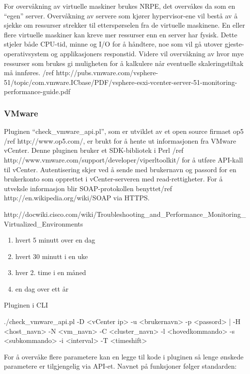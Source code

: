 For overvåkning av virtuelle maskiner brukes NRPE, det overvåkes da som en “egen” server. Overvåkning av servere som kjører hypervisor-ene vil bestå av å sjekke om ressurser strekker til etterspørselen fra de virtuelle maskinene. En eller flere virtuelle maskiner kan kreve mer ressurser enn en server har fysisk. Dette stjeler både CPU-tid, minne og I/O for å håndtere, noe som vil gå utover gjeste-operativsystem og applikasjoners responstid. Videre vil overvåkning av hvor mye ressurser som brukes gi muligheten for å kalkulere når eventuelle skaleringstiltak må innføres. /ref http://pubs.vmware.com/vsphere-51/topic/com.vmware.ICbase/PDF/vsphere-esxi-vcenter-server-51-monitoring-performance-guide.pdf

\subsubsection{VMware}

Pluginen “check\_vmware\_api.pl”, som er utviklet av et open source firmaet op5 /ref http://www.op5.com/, er brukt for å hente ut informasjonen fra VMware vCenter. Denne pluginen bruker et SDK-bibliotek i Perl /ref http://www.vmware.com/support/developer/viperltoolkit/ for å utføre API-kall til vCenter. Autentisering skjer ved å sende med brukernavn og passord for en brukerkonto som opprettet i vCenter-serveren med read-rettigheter. For å utveksle informasjon blir SOAP-protokollen benyttet/ref http://en.wikipedia.org/wiki/SOAP via HTTPS. 

http://docwiki.cisco.com/wiki/Troubleshooting\_and\_Performance\_Monitoring\_Virtualized\_Environments

\begin{enumerate}
	\item hvert 5 minutt over en dag 
	\item hvert 30 minutt i en uke
	\item hver 2. time i en måned
	\item en dag over ett år
\end{enumerate}

Pluginen i CLI

./check\_vmware\_api.pl -D <vCenter ip> -u <brukernavn> -p <passord> | -H <host\_navn> -N <vm\_navn> -C <cluster\_navn>  -l <hovedkommando> -s <subkommando> -i <interval> -T <timeshift>

For å overvåke flere parametere kan en legge til kode i pluginen så lenge ønskede parametere er tilgjengelig via API-et. Navnet på funksjoner følger standarden:

